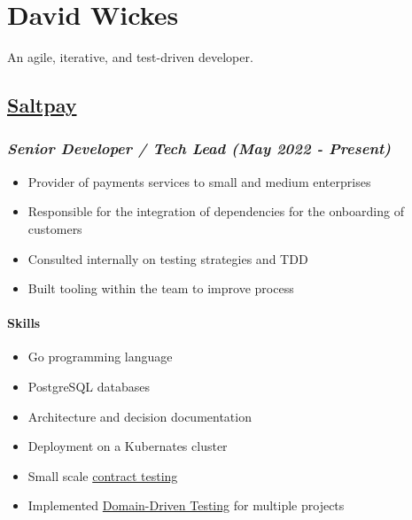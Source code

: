 \hypertarget{david-wickes}{%
\section{David Wickes}\label{david-wickes}}

An agile, iterative, and test-driven developer.

\hypertarget{saltpay}{%
\subsection{\texorpdfstring{\href{https://www.saltpay.co/}{Saltpay}}{Saltpay}}\label{saltpay}}

\hypertarget{saltpay-role}{%
\subsubsection{\texorpdfstring{\emph{Senior Developer / Tech Lead (May
2022 -
Present)}}{Senior Developer / Tech Lead (May 2022 - Present)}}\label{saltpay-role}}

\begin{itemize}
\tightlist
\item
  Provider of payments services to small and medium enterprises
\item
  Responsible for the integration of dependencies for the onboarding of
  customers
\item
  Consulted internally on testing strategies and TDD
\item
  Built tooling within the team to improve process
\end{itemize}

\hypertarget{skills-saltpay}{%
\paragraph{Skills}\label{skills-saltpay}}

\begin{itemize}
\tightlist
\item
  Go programming language
\item
  PostgreSQL databases
\item
  Architecture and decision documentation
\item
  Deployment on a Kubernates cluster
\item
  Small scale
  \href{https://martinfowler.com/bliki/ContractTest.html}{contract
  testing}
\item
  Implemented
  \href{http://www.natpryce.com/articles/000819.html}{Domain-Driven
  Testing} for multiple projects
\end{itemize}

